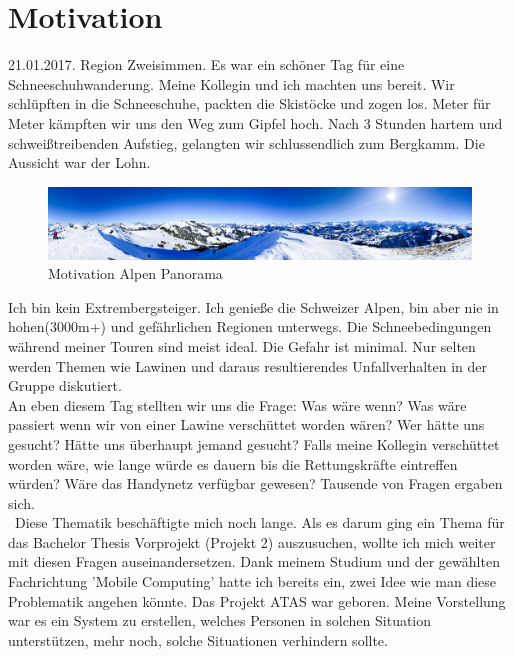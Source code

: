 \documentclass[11pt,english,german]{report}
\theoremstyle{definition}
\begin{document}
\chapter*{Motivation}
21.01.2017. Region Zweisimmen. Es war ein schöner Tag für eine Schneeschuhwanderung. Meine Kollegin und ich machten uns bereit. Wir schlüpften in die Schneeschuhe, packten die Skistöcke und zogen los. Meter für Meter kämpften wir uns den Weg zum Gipfel hoch. Nach 3 Stunden hartem und schweißtreibenden Aufstieg, gelangten wir schlussendlich zum Bergkamm. Die Aussicht war der Lohn.
\begin{figure}[H]
	\centering
	\includegraphics[width=\textwidth]{img/alps/alps_panorama.jpg}
	\caption[Motvation Alpen Panorama]
	{Motivation Alpen Panorama}
\end{figure}
\noindent
Ich bin kein Extrembergsteiger. Ich genieße die Schweizer Alpen, bin aber nie in hohen(3000m+) und gefährlichen Regionen unterwegs. Die Schneebedingungen während meiner Touren sind meist ideal. Die Gefahr ist minimal. Nur selten werden Themen wie Lawinen und daraus resultierendes Unfallverhalten in der Gruppe diskutiert.\\[0.3cm]
An eben diesem Tag stellten wir uns die Frage: Was wäre wenn? Was wäre passiert wenn wir von einer Lawine verschüttet worden wären? Wer hätte uns gesucht? Hätte uns überhaupt jemand gesucht? Falls meine Kollegin verschüttet worden wäre, wie lange würde es dauern bis die Rettungskräfte eintreffen würden? Wäre das Handynetz verfügbar gewesen? Tausende von Fragen ergaben sich.\\[0.3cm]\
Diese Thematik beschäftigte mich noch lange. Als es darum ging ein Thema für das Bachelor Thesis Vorprojekt (Projekt 2) auszusuchen, wollte ich mich weiter mit diesen Fragen auseinandersetzen. Dank meinem Studium und der gewählten Fachrichtung 'Mobile Computing' hatte ich bereits ein, zwei Idee wie man diese Problematik angehen könnte. Das Projekt ATAS war geboren. Meine Vorstellung war es ein System zu erstellen, welches Personen in solchen Situation unterstützen, mehr noch, solche Situationen verhindern sollte.\\[0.3cm]
\end{document}
